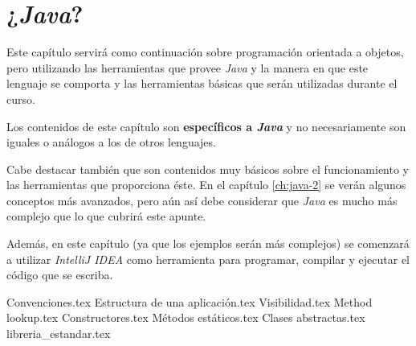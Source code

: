 \chapter{¿\textit{Java}?}
  \label{ch:java}
  Este capítulo servirá como continuación sobre programación orientada a objetos, pero 
  utilizando las herramientas que provee \textit{Java} y la manera en que este lenguaje se
  comporta y las herramientas básicas que serán utilizadas durante el curso.

  Los contenidos de este capítulo son \textbf{específicos a \textit{Java}} y no 
  necesariamente son iguales o análogos a los de otros lenguajes.

  Cabe destacar también que son contenidos muy básicos sobre el funcionamiento y las 
  herramientas que proporciona éste.
  En el capítulo \ref{ch:java-2} se verán algunos conceptos más avanzados, pero aún así
  debe considerar que \textit{Java} es mucho más complejo que lo que cubrirá este apunte.

  Además, en este capítulo (ya que los ejemplos serán más complejos) se comenzará a 
  utilizar \textit{IntelliJ IDEA} como herramienta para programar, compilar y ejecutar 
  el código que se escriba.

  {Convenciones.tex}
  {Estructura de una aplicación.tex}
  {Visibilidad.tex}
  {Method lookup.tex}
  {Constructores.tex}
  {Métodos estáticos.tex}
  {Clases abstractas.tex}
  {libreria_estandar.tex}

  \nocite{*}
  \printbibliography[keyword=java-2]
%
